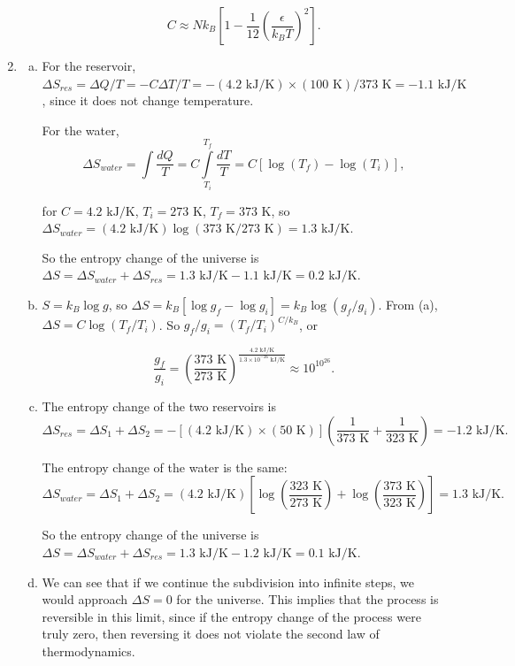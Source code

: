 \documentclass{article}
\begin{document}
\begin{enumerate}
\begin{enumerate}[(a)]
		$$C \approx Nk_B \left[1 - \frac{1}{12} \left(\frac{\epsilon}{k_B T}\right)^2 \right].$$


	\end{enumerate}

	\item

	\begin{enumerate}[(a)]

		\item

		For the reservoir, $\Delta S_{res} = \Delta Q / T = - C \Delta T / T = -(4.2 \text{ kJ/K}) \times (100 \text{ K}) / 373 \text{ K} = -1.1 \text{ kJ/K}$, since it does not change temperature.

		For the water, 
		$$\Delta S_{water} = \int \frac{dQ}{T} = C \int\limits_{T_i}^{T_f} \frac{dT} {T} = C [ \log (T_f) - \log (T_i) ],$$

		for $C = 4.2 \text{ kJ/K}$, $T_i = 273 \text{ K}$, $T_f = 373 \text{ K}$, so $\Delta S_{water} = (4.2 \text{ kJ/K})  \log (373 \text{ K}/ 273 \text{ K}) = 1.3 \text{ kJ/K}$.

		So the entropy change of the universe is $\Delta S = \Delta S_{water} + \Delta S_{res} = 1.3 \text{ kJ/K} - 1.1 \text{ kJ/K} = 0.2 \text{ kJ/K}$.

		\item

		$S = k_B \log g$, so $\Delta S = k_B [\log g_f - \log g_i] = k_B \log (g_f / g_i)$. From (a), $\Delta S = C \log (T_f / T_i)$. So $g_f / g_i = (T_f / T_i)^{C/k_B}$, or

		$$
		\frac{g_f} {g_i} = \left( \frac{373 \text{ K}}{273 \text{ K}} \right) ^ {\frac{4.2 \text{ kJ/K}}{1.3 \times 10^{-26} \text{ kJ/K}}} \approx 10^{10^{26}}.
		$$

		\item

		The entropy change of the two reservoirs is 
		$$
		\Delta S_{res} = \Delta S_1 + \Delta S_2 = -[(4.2 \text{ kJ/K}) \times (50 \text{ K})] \left( \frac{1} {373 \text{ K}} + \frac{1} {323 \text{ K}} \right) = -1.2 \text{ kJ/K}.
		$$

		The entropy change of the water is the same: 
		$$
		\Delta S_{water} = \Delta S_1 + \Delta S_2 = (4.2 \text{ kJ/K}) \left[ \log \left( \frac{323 \text{ K}}{273 \text{ K}} \right) + \log \left( \frac{373 \text{ K}}{323 \text{ K}} \right) \right] = 1.3 \text{ kJ/K}.
		$$

		So the entropy change of the universe is $\Delta S = \Delta S_{water} + \Delta S_{res} = 1.3 \text{ kJ/K} - 1.2 \text{ kJ/K} = 0.1 \text{ kJ/K}$.

		\item

		We can see that if we continue the subdivision into infinite steps, we would approach $\Delta S = 0$ for the universe. This implies that the process is reversible in this limit, since if the entropy change of the process were truly zero, then reversing it does not violate the second law of thermodynamics.

	\end{enumerate}

\end{enumerate}
\end{document}
